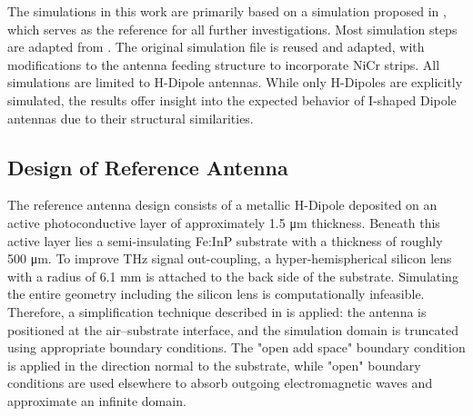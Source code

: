 


The simulations in this work are primarily based on a simulation proposed in \cite{nandiErAsInAlGaAsPhotoconductors2021}, which serves as the reference for all further investigations. Most simulation steps are adapted from \cite{nandiErAsInAlGaAsPhotoconductors2021}. The original simulation file is reused and adapted, with modifications to the antenna feeding structure to incorporate NiCr strips. All simulations are limited to H-Dipole antennas. While only H-Dipoles are explicitly simulated, the results offer insight into the expected behavior of I-shaped Dipole antennas due to their structural similarities. 

\subsection{Design of Reference Antenna}

The reference antenna design consists of a metallic H-Dipole deposited on an active photoconductive layer of approximately \num{1.5} \si{\micro\meter} thickness. Beneath this active layer lies a semi-insulating Fe:InP substrate with a thickness of roughly \num{500} \si{\micro\meter}. To improve THz signal out-coupling, a hyper-hemispherical silicon lens with a radius of \num{6.1} \si{\milli\meter} is attached to the back side of the substrate. Simulating the entire geometry including the silicon lens is computationally infeasible. Therefore, a simplification technique described in \cite{llombartTHzTimeDomainSensing2012,garufoNortonEquivalentCircuit2018} is applied: the antenna is positioned at the air–substrate interface, and the simulation domain is truncated using appropriate boundary conditions. The "open add space" boundary condition is applied in the direction normal to the substrate, while "open" boundary conditions are used elsewhere to absorb outgoing electromagnetic waves and approximate an infinite domain.

